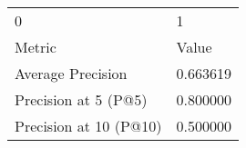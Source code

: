 \begin{tabular}{ll}
0 & 1 \\
Metric & Value \\
Average Precision & 0.663619 \\
Precision at 5 (P@5) & 0.800000 \\
Precision at 10 (P@10) & 0.500000 \\
\end{tabular}
